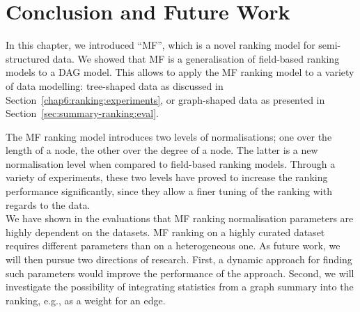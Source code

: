 \section{Conclusion and Future Work}

In this chapter, we introduced ``MF'', which is a novel ranking model for semi-structured data. We showed that \gls{MF} is a generalisation of \gls{field}-based ranking models to a DAG model. This allows to apply the \gls{MF} ranking model to a variety of data modelling: tree-shaped data as discussed in Section~\ref{chap6:ranking:experiments}, or graph-shaped data as presented in Section~\ref{sec:summary-ranking:eval}.

The \gls{MF} ranking model introduces two levels of normalisations; one over the length of a node, the other over the degree of a node. The latter is a new normalisation level when compared to field-based ranking models. Through a variety of experiments, these two levels have proved to increase the ranking performance significantly, since they allow a finer tuning of the ranking with regards to the data.\\

We have shown in the evaluations that \gls{MF} ranking normalisation parameters are highly dependent on the datasets. \gls{MF} ranking on a highly curated dataset requires different parameters than on a heterogeneous one. As future work, we will then pursue two directions of research. First, a dynamic approach for finding such parameters would improve the performance of the approach. Second, we will investigate the possibility of integrating statistics from a graph summary into the ranking, e.g., as a weight for an edge.

